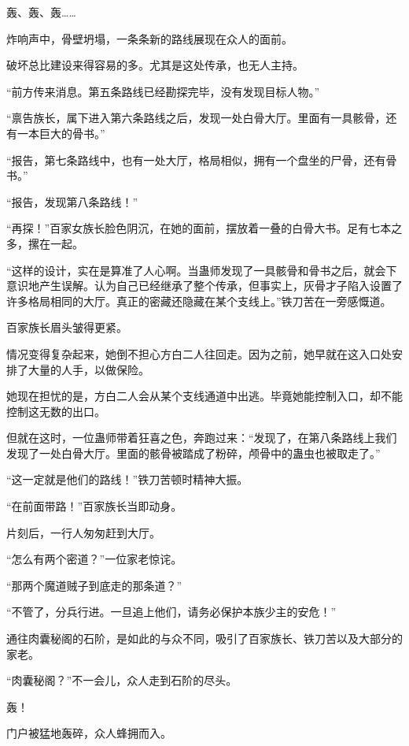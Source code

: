
\begin{this_body}

轰、轰、轰……

炸响声中，骨壁坍塌，一条条新的路线展现在众人的面前。

破坏总比建设来得容易的多。尤其是这处传承，也无人主持。

“前方传来消息。第五条路线已经勘探完毕，没有发现目标人物。”

“禀告族长，属下进入第六条路线之后，发现一处白骨大厅。里面有一具骸骨，还有一本巨大的骨书。”

“报告，第七条路线中，也有一处大厅，格局相似，拥有一个盘坐的尸骨，还有骨书。”

“报告，发现第八条路线！”

“再探！”百家女族长脸色阴沉，在她的面前，摆放着一叠的白骨大书。足有七本之多，摞在一起。

“这样的设计，实在是算准了人心啊。当蛊师发现了一具骸骨和骨书之后，就会下意识地产生误解。认为自己已经继承了整个传承，但事实上，灰骨才子陷入设置了许多格局相同的大厅。真正的密藏还隐藏在某个支线上。”铁刀苦在一旁感慨道。

百家族长眉头皱得更紧。

情况变得复杂起来，她倒不担心方白二人往回走。因为之前，她早就在这入口处安排了大量的人手，以做保险。

她现在担忧的是，方白二人会从某个支线通道中出逃。毕竟她能控制入口，却不能控制这无数的出口。

但就在这时，一位蛊师带着狂喜之色，奔跑过来：“发现了，在第八条路线上我们发现了一处白骨大厅。里面的骸骨被踏成了粉碎，颅骨中的蛊虫也被取走了。”

“这一定就是他们的路线！”铁刀苦顿时精神大振。

“在前面带路！”百家族长当即动身。

片刻后，一行人匆匆赶到大厅。

“怎么有两个密道？”一位家老惊诧。

“那两个魔道贼子到底走的那条道？”

“不管了，分兵行进。一旦追上他们，请务必保护本族少主的安危！”

通往肉囊秘阁的石阶，是如此的与众不同，吸引了百家族长、铁刀苦以及大部分的家老。

“肉囊秘阁？”不一会儿，众人走到石阶的尽头。

轰！

门户被猛地轰碎，众人蜂拥而入。


\end{this_body}
